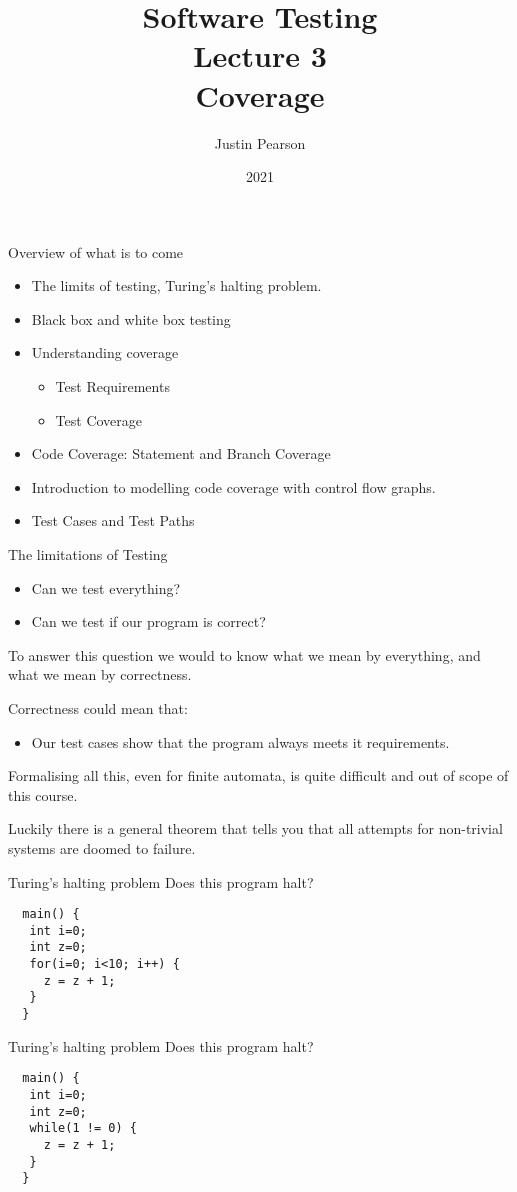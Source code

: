 \documentclass[handout]{beamer}
\title{Software Testing\\ Lecture 3\\ Coverage}
\author{Justin Pearson}
\date{2021}
\begin{document}
\lstset{language=C}

\begin{frame}
  \maketitle
\end{frame}
\begin{frame}{Overview of what is to come}
  \begin{itemize}
  \item The limits of testing, Turing's halting problem.
  \item Black box and white box testing
  \item Understanding coverage
    \begin{itemize}
    \item Test Requirements
    \item Test Coverage      
    \end{itemize}
  \item Code Coverage: Statement and Branch Coverage
  \item Introduction to modelling code coverage with control flow
    graphs.
  \item Test Cases and Test Paths
  \end{itemize}
\end{frame}
\begin{frame}{The limitations of Testing}

  \begin{itemize}
  \item Can we test everything?
  \item Can we test if our program is correct?
  \end{itemize}
To answer this question we would to know what we mean by everything,
and what we mean by correctness.

Correctness could mean that: 
\begin{itemize}
\item Our test cases show that the program always meets it
  requirements.
\end{itemize}
Formalising all this, even for finite automata, is quite difficult and
out of scope of this course.

Luckily there is a general theorem that tells you that all attempts
for non-trivial systems are doomed to failure.

\end{frame}
\begin{frame}[fragile]{Turing's halting problem}
Does this program halt?
\begin{lstlisting}
  main() {
   int i=0;
   int z=0;
   for(i=0; i<10; i++) {
     z = z + 1;
   }
  }
\end{lstlisting}
\end{frame}
\begin{frame}[fragile]{Turing's halting problem}
Does this program halt?
\begin{lstlisting}
  main() {
   int i=0;
   int z=0;
   while(1 != 0) {
     z = z + 1;
   }
  }
\end{lstlisting}
\end{frame}
\end{document}
